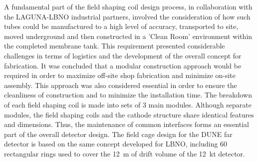 A fundamental part of the field shaping coil design process, in
collaboration with the LAGUNA-LBNO industrial partners, involved the
consideration of how such tubes could be manufactured to a high level
of accuracy, transported to site, moved underground and then
constructed in a 'Clean Room' environment within the completed
membrane tank.  This requirement presented considerable challenges in
terms of logistics and the development of the overall concept for
fabrication.  It was concluded that a modular construction approach
would be required in order to maximize off-site shop fabrication and
minimize on-site assembly.  This approach was also considered
essential in order to ensure the cleanliness of construction and to
minimize the installation time. The breakdown of each field shaping
coil is made into sets of 3 main modules.  Although separate modules,
the field shaping coils and the cathode structure share identical
features and dimensions.  Thus, the maintenance of common interfaces
forms an essential part of the overall detector design. The field cage
design for the DUNE far detector is based on the same concept
developed for LBNO, including 60 rectangular rings used to cover the
12~m of drift volume of the 12~kt detector.


